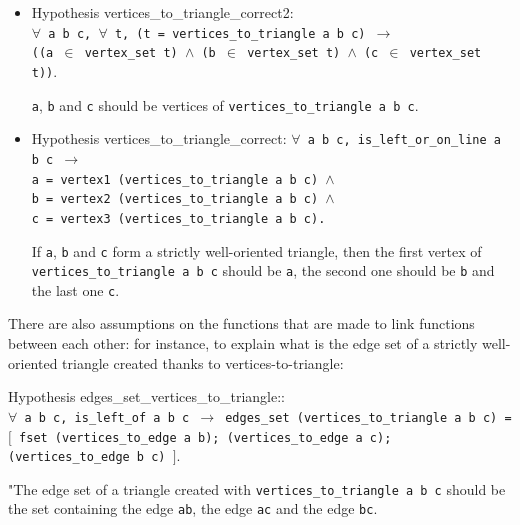 \documentclass[a4paper,10pt]{article}
\def\hypothesis#1#2{{\color{purple}Hypothesis} {\color{blue}#1}: {\tt #2}}
\begin{document}
\begin{itemize}
\item \hypothesis{vertices\_to\_triangle\_correct2}{\\$\forall$ a b c, $\forall$ t,
          (t = vertices\_to\_triangle a b c) $\rightarrow$\\
          ((a $\in$ vertex\_set t) $\wedge$ (b $\in$ vertex\_set t) $\wedge$ (c $\in$ vertex\_set t))}.
        
        {\tt a}, {\tt b} and {\tt c} should be vertices of {\tt vertices\_to\_triangle a b c}.


      \item \hypothesis{vertices\_to\_triangle\_correct}{$\forall$ a b c, 
    is\_left\_or\_on\_line a b c $\rightarrow$\\
    a = vertex1 (vertices\_to\_triangle a b c) $\wedge$\\
    b = vertex2 (vertices\_to\_triangle a b c) $\wedge$\\
    c = vertex3 (vertices\_to\_triangle a b c).}

  If {\tt a}, {\tt b} and {\tt c} form a strictly well-oriented triangle, then the first vertex of {\tt vertices\_to\_triangle a b c} should be {\tt a}, the second one should be {\tt b} and the last one {\tt c}.

        

\end{itemize}
There are also assumptions on the functions that are made to link functions between each other: for instance, to explain what is the edge set of a strictly well-oriented triangle created thanks to vertices-to-triangle:

\hypothesis{edges\_set\_vertices\_to\_triangle:}
  {\\$\forall$ a b c, is\_left\_of a b c $\rightarrow$
    edges\_set (vertices\_to\_triangle a b c) =\\ 
                       $[$ fset (vertices\_to\_edge a b);
                           (vertices\_to\_edge a c);
                           (vertices\_to\_edge b c) $]$}.

                         "The edge set of a triangle created with {\tt vertices\_to\_triangle a b c} should be the set containing the edge {\tt ab}, the edge {\tt ac} and the edge {\tt bc}.
                         
\end{document}
